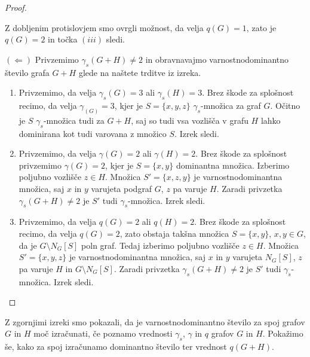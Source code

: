 \documentclass[12pt,a4paper,twoside]{article}
\theoremstyle{definition} %
\theoremstyle{plain} %
\numberwithin{equation}{section}  %
\begin{document}
\begin{proof}
\begin{itemize}
Z dobljenim protislovjem smo ovrgli možnost, da velja $q(G) =1$, zato je $q(G)=2$ in točka $(iii)$ sledi.
\end{itemize}

\noindent $(\Leftarrow)$ Privzemimo $\gamma_s(G+H) \neq 2$ in obravnavajmo varnostnodominantno število grafa $G+H$ glede na naštete trditve iz izreka.
\begin{enumerate}[label=($\roman*)$]
\item Privzemimo, da velja $\gamma_s(G)=3$ ali $\gamma_s(H)=3$. Brez škode za splošnost recimo, da velja $\gamma_(G)=3$, kjer je $S =\{x,y,z\}$ $\gamma_s$-množica za graf $G$. Očitno je $S$ $\gamma_s$-množica tudi za $G+H$, saj so tudi vsa vozlišča v grafu $H$ lahko dominirana kot tudi varovana z množico $S$. Izrek sledi.
\item Privzemimo, da velja $\gamma(G) = 2$ ali $\gamma(H) = 2$. Brez škode za splošnost privzemimo $\gamma(G) = 2$, kjer je $S = \{x,y\}$ dominantna množica. Izberimo poljubno vozlišče $z \in H$. Množica $S' = \{x,z,y\}$ je varnostnodominantna množica, saj $x$ in $y$ varujeta podgraf $G$, $z$ pa varuje $H$. Zaradi privzetka $\gamma_s(G+H) \neq 2$ je $S'$ tudi $\gamma_s$-množica. Izrek sledi.
\item Privzemimo, da velja $q(G)=2$ ali $q(H)=2$. Brez škode za splošnost recimo, da velja $q(G)=2$, zato obstaja takšna množica $S =\{x,y\}$, $x,y \in G$, da je $G \setminus N_G[S]$ poln graf. Tedaj izberimo poljubno vozlišče $z \in H$. Množica $S' = \{x,y,z\}$ je varnostnodominantna množica, saj $x$ in $y$ varujeta $N_G[S]$, $z$ pa varuje $H$ in $G \setminus N_G[S]$. Zaradi privzetka $\gamma_s(G+H) \neq 2$ je $S'$ tudi $\gamma_s$-množica. Izrek sledi.\qedhere
\end{enumerate}
\end{proof}

Z zgornjimi izreki smo pokazali, da je varnostnodominantno število za spoj grafov $G$ in $H$ moč izračunati, če poznamo vrednosti $\gamma_s$, $\gamma$ in $q$ grafov $G$ in $H$. Pokažimo še, kako za spoj izračunamo dominantno število ter vrednost $q(G + H)$.
\end{document}
